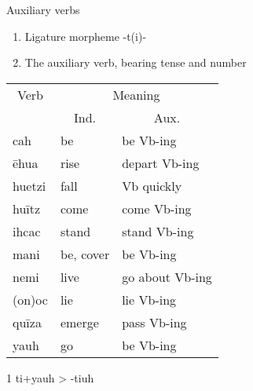 \documentclass[12pt]{beamer}
\newcommand{\nah}[1]{\textcolor{nahgrn}{#1}}
\newcommand{\trs}[1]{\textcolor{nahblu}{#1}}
\begin{document}
\begin{frame}
\begin{columns}[t]
\begin{column}{.18\linewidth}
\begin{block}{Auxiliary verbs}
\begin{enumerate}
          \item Ligature morpheme \nah{-t(i)-}
          \item The auxiliary verb, bearing tense and number
        \end{enumerate}
        \begin{threeparttable}
          \begin{tabular}{lll}
            \multicolumn{1}{c}{Verb} & \multicolumn{2}{c}{Meaning}                            \\
                                     & \multicolumn{1}{c}{Ind.}    & \multicolumn{1}{c}{Aux.} \\
            \nah{cah}                & \trs{be}                    & \trs{be Vb-ing}          \\
            \nah{ēhua}               & \trs{rise}                  & \trs{depart   Vb-ing}    \\
            \nah{huetzi}             & \trs{fall}                  & \trs{Vb   quickly}       \\
            \nah{huītz}              & \trs{come}                  & \trs{come   Vb-ing}      \\
            \nah{ihcac}              & \trs{stand}                 & \trs{stand   Vb-ing}     \\
            \nah{mani}               & \trs{be, cover}             & \trs{be Vb-ing}          \\
            \nah{nemi}               & \trs{live}                  & \trs{go   about Vb-ing}  \\
            \nah{(on)oc}             & \trs{lie}                   & \trs{lie   Vb-ing}       \\
            \nah{quīza}              & \trs{emerge}                & \trs{pass   Vb-ing}      \\
            \nah{yauh}\tnote{1}      & \trs{go}                    & \trs{be Vb-ing}          \\
          \end{tabular}
          \begin{tablenotes}
            \item[1] \nah{ti+yauh} > \nah{-tiuh}
          \end{tablenotes}
        \end{threeparttable}


\end{block}
\end{column}
\end{columns}
\end{frame}
\end{document}
